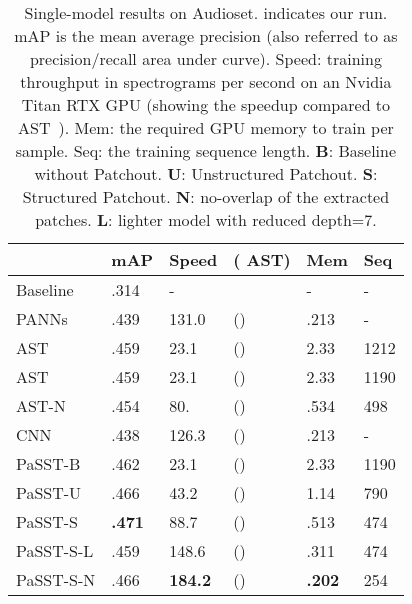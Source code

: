 \documentclass[a4paper]{article}
\begin{document}
\begin{table}[bt]
\centering
\begin{tabular}{l|l|ll|l|l}
     & mAP & Speed & ( AST) & Mem & Seq \\ \hline
Baseline~\cite{audioset2017Gemmeke} & .314   &     -   &     &   - & -\\ 
PANNs~\cite{KongCIWWP20panns} &  .439  &     131.0  &  ()   &   .213 & -  \\ AST~\cite{gong21ast}  & .459   &        23.1   & ()    &   2.33 & 1212   \\ \hline AST~\cite{gong21ast}  & .459   &    23.1   &  ()     & 2.33  & 1190    \\ 
AST-N~\cite{gong21ast}  & .454   &    80.   &  ()     & .534 &  498  \\ 
CNN~\cite{koutini21journal}  & .438    &   126.3  &  ()    &  .213 &  - \\ \hline  \hline PaSST-B  &  .462  &     23.1   &  ()    &  2.33&   1190 \\
PaSST-U  &   .466  &    43.2   &   ()      &   1.14 &  790  \\ 
PaSST-S     &\textbf{ .471} &     88.7  &   ()   &  .513  &  474\\
PaSST-S-L  &   .459  &  148.6         & () & .311 & 474   \\ PaSST-S-N  &  .466  &      \textbf{184.2}   &   ()  &  \textbf{.202} & 254  \\
\hline 
\end{tabular}
\caption{Single-model results on Audioset.  indicates our run. mAP is the mean average precision (also referred to as precision/recall area under curve).  Speed: training throughput in spectrograms per second on an Nvidia Titan RTX GPU (showing the speedup compared to AST~\cite{gong21ast}). Mem: the required GPU memory to train per sample. Seq: the training sequence length.  \textbf{B}: Baseline without Patchout. \textbf{U}: Unstructured Patchout. \textbf{S}: Structured Patchout. \textbf{N}: no-overlap of the extracted patches. \textbf{L}: lighter model with reduced depth=7. }
\label{tab:audioset:results}
\end{table}
\end{document}
